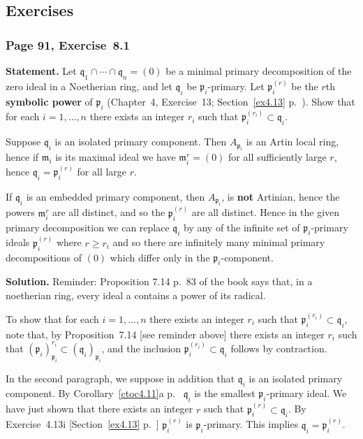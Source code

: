 \documentclass[12pt,letterpaper]{article}%
\newcommand{\mf}{\mathfrak}
\newcommand{\mmm}{\mf m}
\newcommand{\ppp}{\mf p}
\newcommand{\qqq}{\mf q}
\newcommand{\nn}{\noindent}
\begin{document}
\subsection{Exercises}%

\subsubsection{Page 91, Exercise~8.1}%

\textbf{Statement.} Let $\qqq_1\cap\cdots\cap\qqq_n=(0)$ be a minimal primary decomposition of the zero ideal in a Noetherian ring, and let $\qqq_i$ be $\ppp_i$-primary. Let $\ppp_i^{(r)}$ be the $r$th \textbf{symbolic power} of $\ppp_i$ (Chapter~4, Exercise~13; Section~\ref{ex4.13} p.~\pageref{ex4.13}). Show that for each $i=1,\ldots,n$ there exists an integer $r_i$ such that $\ppp_i^{(r_i)}\subset\qqq_i$.

Suppose $\qqq_i$ is an isolated primary component. Then $A_{\ppp_i}$ is an Artin local ring, hence if $\mmm_i$ is its maximal ideal we have $\mmm_i^r=(0)$ for all sufficiently large $r$, hence $\qqq_i=\ppp_i^{(r)}$ for all large $r$.

If $\qqq_i$ is an embedded primary component, then $A_{\ppp_i}$, is \textbf{not} Artinian, hence the powers $\mmm_i^r$ are all distinct, and so the $\ppp_i^{(r)}$ are all distinct. Hence in the given primary decomposition we can replace $\qqq_i$ by any of the infinite set of $\ppp_i$-primary ideals $\ppp_i^{(r)}$ where $r\ge r_i$ and so there are infinitely many minimal primary decompositions of $(0)$ which differ only in the $\ppp_i$-component.

\nn\textbf{Solution.} Reminder: Proposition 7.14 p.~83 of the book says that, in a noetherian ring, every ideal a contains a power of its radical.

To show that for each $i=1,\ldots,n$ there exists an integer $r_i$ such that $\ppp_i^{(r_i)}\subset\qqq_i$, note that, by Proposition~7.14 [see reminder above] there exists an integer $r_i$ such that $(\ppp_i)_{\ppp_i}^{r_i}\subset(\qqq_i)_{\ppp_i}$, and the inclusion $\ppp_i^{(r_i)}\subset\qqq_i$ follows by contraction.

In the second paragraph, we suppose in addition that $\qqq_i$ is an isolated primary component. By Corollary~\ref{ctoc4.11}a p.~\pageref{ctoc4.11} $\qqq_i$ is the smallest $\ppp_i$-primary ideal. We have just shown that there exists an integer $r$ such that $\ppp_i^{(r)}\subset\qqq_i$. By Exercise~4.13i [Section~\ref{ex4.13} p.~\pageref{ex4.13}] $\ppp_i^{(r)}$ is $\ppp_i$-primary. This implies $\qqq_i=\ppp_i^{(r)}$.%
\end{document}
